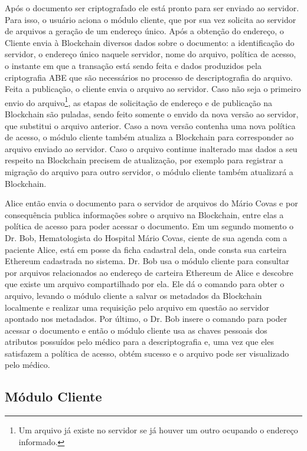 \documentclass[a4paper,11pt]{article}
\begin{document}
Após o documento ser criptografado ele está pronto para ser enviado ao servidor.
Para isso, o usuário aciona o módulo cliente, que por sua vez solicita ao servidor de arquivos a geração de um endereço único.
Após a obtenção do endereço, o Cliente envia à Blockchain diversos dados sobre o documento: a identificação do servidor, o endereço único naquele servidor, nome do arquivo, política de acesso, o instante em que a transação está sendo feita e dados produzidos pela criptografia ABE que são necessários no processo de descriptografia do arquivo.
Feita a publicação, o cliente envia o arquivo ao servidor.
Caso não seja o primeiro envio do arquivo\footnote{Um arquivo já existe no servidor se já houver um outro ocupando o endereço informado.}, as etapas de solicitação de endereço e de publicação na Blockchain são puladas, sendo feito somente o envido da nova versão ao servidor, que substitui o arquivo anterior.
Caso a nova versão contenha uma nova política de acesso, o módulo cliente também atualiza a Blockchain para corresponder ao arquivo enviado ao servidor.
Caso o arquivo continue inalterado mas dados a seu respeito na Blockchain precisem de atualização, por exemplo para registrar a migração do arquivo para outro servidor, o módulo cliente também atualizará a Blockchain.

Alice então envia o documento para o servidor de arquivos do Mário Covas e por consequência publica informações sobre o arquivo na Blockchain, entre elas a política de acesso para poder acessar o documento.
Em um segundo momento o Dr. Bob, Hematologista do Hospital Mário Covas, ciente de sua agenda com a paciente Alice, está em posse da ficha cadastral dela, onde consta sua carteira Ethereum cadastrada no sistema.
Dr. Bob usa o módulo cliente para consultar por arquivos relacionados ao endereço de carteira Ethereum de Alice e descobre que existe um arquivo compartilhado por ela.
Ele dá o comando para obter o arquivo, levando o módulo cliente a salvar os metadados da Blockchain localmente e realizar uma requisição pelo arquivo em questão ao servidor apontado nos metadados. %
Por último, o Dr. Bob insere o comando para poder acessar o documento e então o módulo cliente usa as chaves pessoais dos atributos possuídos pelo médico para a descriptografia e, uma vez que eles satisfazem a política de acesso, obtém sucesso e o arquivo pode ser visualizado pelo médico.

\subsection{Módulo Cliente}
\end{document}
